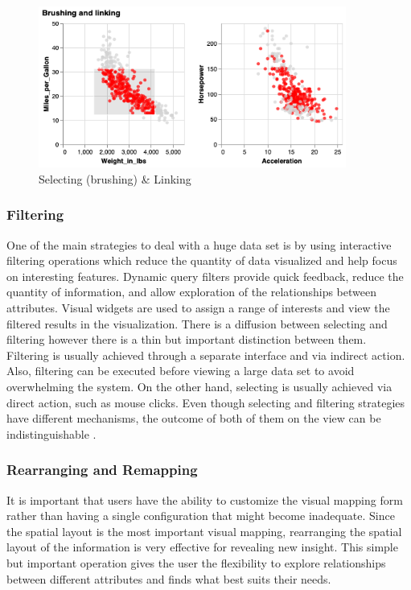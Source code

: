 \begin{figure}[H]
\centering
\captionsetup{justification=centering}
\includegraphics[width=0.9\textwidth]{Report-latex/tex_files/pics/brlink2.png}
\caption{Selecting (brushing) \& Linking \cite{brushlink}}
\label{fig:Brushing\&Linking}
\end{figure}


\subsubsection{Filtering}

One of the main strategies to deal with a huge data set is by using interactive filtering operations which reduce the quantity of data visualized and help focus on interesting features. Dynamic query filters provide quick feedback, reduce the quantity of information, and allow exploration of the relationships between attributes. Visual widgets are used to assign a range of interests and view the filtered results in the visualization. There is a diffusion between selecting and filtering however there is a thin but important distinction between them. Filtering is usually achieved through a separate interface and via indirect action. Also, filtering can be executed before viewing a large data set to avoid overwhelming the system. On the other hand, selecting is usually achieved via direct action, such as mouse clicks. Even though selecting and filtering strategies have different mechanisms, the outcome of both of them on the view can be indistinguishable \cite{ward2015interactive}.

\subsubsection{Rearranging and Remapping}

It is important that users have the ability to customize the visual mapping form rather than having a single configuration that might become inadequate. Since the spatial layout is the most important visual mapping, rearranging the spatial layout of the information is very effective for revealing new insight. This simple but important operation gives the user the flexibility to explore relationships between different attributes and finds what best suits their needs.